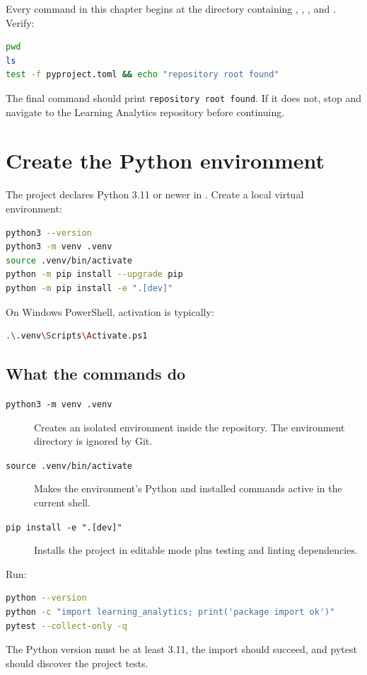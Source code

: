 Every command in this chapter begins at the directory containing
, , , and
. Verify:

\begin{lstlisting}[language=bash]
pwd
ls
test -f pyproject.toml && echo "repository root found"
\end{lstlisting}

The final command should print \texttt{repository root found}. If it does not,
stop and navigate to the Learning Analytics repository before continuing.

\section{Create the Python environment}

The project declares Python 3.11 or newer in .
Create a local virtual environment:

\begin{lstlisting}[language=bash]
python3 --version
python3 -m venv .venv
source .venv/bin/activate
python -m pip install --upgrade pip
python -m pip install -e ".[dev]"
\end{lstlisting}

On Windows PowerShell, activation is typically:

\begin{lstlisting}[language=bash]
.\.venv\Scripts\Activate.ps1
\end{lstlisting}

\subsection{What the commands do}

\begin{description}
  \item[\texttt{python3 -m venv .venv}] Creates an isolated environment inside
    the repository. The environment directory is ignored by Git.
  \item[\texttt{source .venv/bin/activate}] Makes the environment's Python and
    installed commands active in the current shell.
  \item[\texttt{pip install -e ".[dev]"}] Installs the project in editable mode
    plus testing and linting dependencies.
\end{description}

\begin{validationbox}
Run:
\begin{lstlisting}[language=bash]
python --version
python -c "import learning_analytics; print('package import ok')"
pytest --collect-only -q
\end{lstlisting}
The Python version must be at least 3.11, the import should succeed, and pytest
should discover the project tests.
\end{validationbox}

